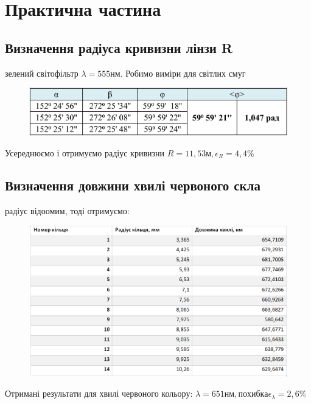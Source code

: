 \section{Практична частина}

\subsection{Визначення радіуса кривизни лінзи R}
\setlength{\parindent}{4em}
 зелений світофільтр $\lambda = 555 нм$. Робимо виміри для світлих смуг

\begin{figure}[ht]

\centering

\includegraphics[width=0.8\linewidth]{Pics/tabl1.png}


\label{Teo}

\end{figure}
Усереднюємо і отримуємо радіус кривизни $R = 11,53 м, \epsilon_{R} = 4,4\%$
\subsection{Визначення довжини хвилі червоного скла}
 радіус відоомим, тоді отримуємо:

\begin{figure}[ht]

\centering

\includegraphics[width=0.8\linewidth]{Pics/tabl2.png}


\label{width}

\end{figure}
Отримані результати для хвилі червоного кольору: $\lambda = 651 нм, похибка \epsilon_{\lambda} = 2,6\%$
\newpage

